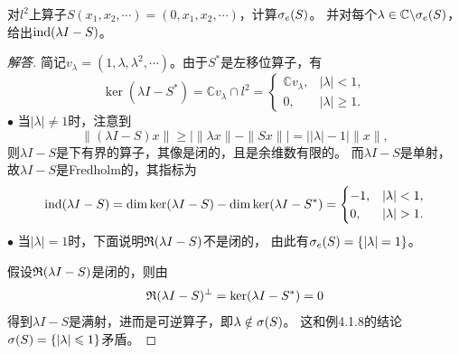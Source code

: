 \begin{8}
    对$l^2$上算子$S(x_1,x_2,\cdots)=(0,x_1,x_2,\cdots)$，计算$\sigma_e(S)$。
    并对每个$\lambda\in\mathbb{C}\backslash\sigma_e(S)$，给出$\operatorname{ind}(\lambda I-S)$。
\end{8}
\begin{proof}[解答]
    简记$v_\lambda=(1,\lambda,\lambda^2,\cdots)$。由于$S^*$是左移位算子，有
    \[\ker(\lambda I-S^*)=\mathbb{C}v_\lambda \cap l^2
    =\begin{cases}\mathbb{C}v_\lambda,&|\lambda|<1,\\
    0,&|\lambda|\geqslant1.\end{cases}\]
    $\bullet$ 当$|\lambda|\ne1$时，注意到
    \[\|(\lambda I-S)x\|\geqslant\big|\|\lambda x\|-\|Sx\|\big|
    =\big||\lambda|-1\big|\|x\|,\]
    则$\lambda I-S$是下有界的算子，其像是闭的，且是余维数有限的。
    而$\lambda I-S$是单射，故$\lambda I-S$是Fredholm的，其指标为
    \[\ind(\lambda I-S)=\dim\ker(\lambda I-S)-\dim\ker(\lambda I-S^*)
    =\begin{cases}-1,&|\lambda|<1,\\0,&|\lambda|>1.\end{cases}\]
    $\bullet$ 当$|\lambda|=1$时，下面说明$\mathfrak{R}(\lambda I-S)$不是闭的，
    由此有$\sigma_e(S)=\{|\lambda|=1\}$。

    假设$\mathfrak{R}(\lambda I-S)$是闭的，则由
    \[\mathfrak{R}(\lambda I-S)^\perp=\ker(\lambda I-S^*)=0\]
    得到$\lambda I-S$是满射，进而是可逆算子，即$\lambda\notin\sigma(S)$。
    这和例4.1.8的结论$\sigma(S)=\{|\lambda|\leqslant1\}$矛盾。
\end{proof}

